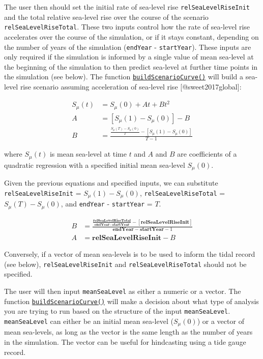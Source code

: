 The user then should set the initial rate of sea-level rise
\texttt{relSeaLevelRiseInit} and the total relative sea-level rise over
the course of the scenario \texttt{relSeaLevelRiseTotal}. These two
inputs control how the rate of sea-level rise accelerates over the
course of the simulation, or if it stays constant, depending on the
number of years of the simulation (\texttt{endYear} -
\texttt{startYear}). These inputs are only required if the simulation is
informed by a single value of mean sea-level at the beginning of the
simulation to then predict sea-level at further time points in the
simulation (see below). The function
\protect\hyperlink{buildscenariocurve}{\texttt{buildScenarioCurve()}}
will build a sea-level rise scenario assuming acceleration of sea-level
rise {[}@sweet2017global{]}:

\begin{align}
S_{\mu}(t) &= S_{\mu}(0) + At + Bt^2\\
A &= [S_{\mu}(1) - S_{\mu}(0)] - B\\
B &= \frac{\frac{S_{\mu}(T) - S_{\mu}(0)}{T} - [S_{\mu}(1) - S_{\mu}(0)]}{T - 1}
\end{align}

where \(S_{\mu}(t)\) is mean sea-level at time \(t\) and \(A\) and \(B\)
are coefficients of a quadratic regression with a specified initial mean
sea-level \(S_{\mu}(0)\).

Given the previous equations and specified inputs, we can substitute
\texttt{relSeaLevelRiseInit} = \(S_{\mu}(1) - S_{\mu}(0)\),
\texttt{relSeaLevelRiseTotal} = \(S_{\mu}(T) - S_{\mu}(0)\), and
\texttt{endYear} - \texttt{startYear} = \(T\).

\begin{align}
B &= \frac{\frac{\textbf{relSeaLevelRiseTotal}}{\textbf{endYear} - \textbf{startYear}} - [\textbf{relSeaLevelRiseInit}]}{\textbf{endYear} - \textbf{startYear} - 1}\\
A &= \textbf{relSeaLevelRiseInit} - B
\end{align}

Conversely, if a vector of mean sea-levels is to be used to inform the
tidal record (see below), \texttt{relSeaLevelRiseInit} and
\texttt{relSeaLevelRiseTotal} should not be specified.

The user will then input \texttt{meanSeaLevel} as either a numeric or a
vector. The function
\protect\hyperlink{buildscenariocurve}{\texttt{buildScenarioCurve()}}
will make a decision about what type of analysis you are trying to run
based on the structure of the input \texttt{meanSeaLevel}.
\texttt{meanSeaLevel} can either be an initial mean sea-level
(\(S_{\mu}(0)\)) or a vector of mean sea-levels, as long as the vector
is the same length as the number of years in the simulation. The vector
can be useful for hindcasting using a tide gauge record.

